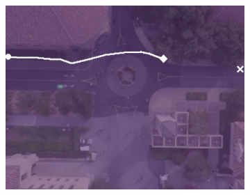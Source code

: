 \documentclass[letterpaper,10pt,conference]{ieeeconf}
\begin{document}
\begin{figure}[t!]
\begin{subfigure}[t]{0.48\textwidth}
\begin{minipage}[c]{0.3\linewidth}
		\includegraphics[width=\linewidth]{./figures/comparison/lstm_1_2_t=380.jpg}
	\end{minipage}
	

\end{subfigure}
\end{figure}
\end{document}
